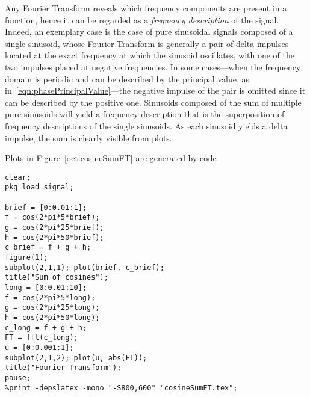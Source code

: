\documentclass[\documentfontsize, twocolumn]{\classname}
\begin{document}
Any Fourier Transform reveals which frequency components are present in a
function, hence it can be regarded as a \emph{frequency description} of the
signal. Indeed, an exemplary case is the case of pure sinusoidal signals
composed of a single sinusoid, whose Fourier Transform is generally a pair of
delta-impulses located at the exact frequency at which the sinusoid oscillates,
with one of the two impulses placed at negative frequencies. In some
cases---when the frequency domain is periodic and can be described by the
principal value, as in~\ref{eqn:phasePrincipalValue}---the negative impulse of
the pair is omitted since it can be described by the positive one. Sinusoids
composed of the sum of multiple pure sinusoids will yield a frequency
description that is the superposition of frequency descriptions of the single
sinusoids. As each sinusoid yields a delta impulse, the sum is clearly visible
from plots.

Plots in Figure~\ref{oct:cosineSumFT} are generated by code 

\begin{verbatim}
clear;
pkg load signal;

brief = [0:0.01:1];
f = cos(2*pi*5*brief);
g = cos(2*pi*25*brief);
h = cos(2*pi*50*brief);
c_brief = f + g + h;
figure(1);
subplot(2,1,1); plot(brief, c_brief);
title("Sum of cosines");
long = [0:0.01:10];
f = cos(2*pi*5*long);
g = cos(2*pi*25*long);
h = cos(2*pi*50*long);
c_long = f + g + h;
FT = fft(c_long);
u = [0:0.001:1];
subplot(2,1,2); plot(u, abs(FT)); 
title("Fourier Transform");
pause;
%print -depslatex -mono "-S800,600" "cosineSumFT.tex";
\end{verbatim}

\begin{figure*}[ht]
\begin{center}
\scalebox{0.5}{

    }\caption{Plot of the Fourier Transform of \texttt{cos(2*pi*x)}. The two
    impulses are located very close to $0$ and $1$.}\label{oct:cosineFT}
\end{center}
\end{figure*}

\begin{figure*}[ht]
\begin{center}
\scalebox{0.5}{

    }\caption{Signal $c(x) = \cos{2\pi 5 x} + \cos{2\pi 25 x} + \cos{2\pi 50x}$
    and its Fourier Transform. The resulting Fourier Transform, obtained with
    function \texttt{fft()}, is the superposition of three distinct
    frequencies, each related to one of the three sinusoids forming signal
    $c(x)$.}\label{oct:cosineSumFT}
\end{center}
\end{figure*}
\end{document}

